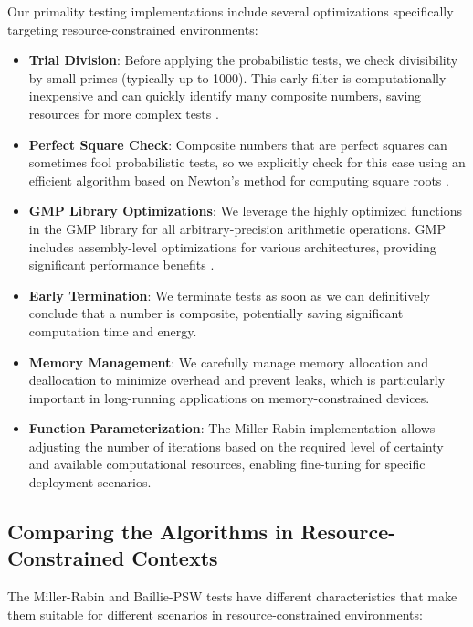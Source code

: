Our primality testing implementations include several optimizations specifically targeting resource-constrained environments:

\begin{itemize}
    \item \textbf{Trial Division}: Before applying the probabilistic tests, we check divisibility by small primes (typically up to 1000). This early filter is computationally inexpensive and can quickly identify many composite numbers, saving resources for more complex tests \cite{taxonomy_primality}.
    
    \item \textbf{Perfect Square Check}: Composite numbers that are perfect squares can sometimes fool probabilistic tests, so we explicitly check for this case using an efficient algorithm based on Newton's method for computing square roots \cite{crandall2005}.
    
    \item \textbf{GMP Library Optimizations}: We leverage the highly optimized functions in the GMP library for all arbitrary-precision arithmetic operations. GMP includes assembly-level optimizations for various architectures, providing significant performance benefits \cite{granlund2012}.
    
    \item \textbf{Early Termination}: We terminate tests as soon as we can definitively conclude that a number is composite, potentially saving significant computation time and energy.
    
    \item \textbf{Memory Management}: We carefully manage memory allocation and deallocation to minimize overhead and prevent leaks, which is particularly important in long-running applications on memory-constrained devices.
    
    \item \textbf{Function Parameterization}: The Miller-Rabin implementation allows adjusting the number of iterations based on the required level of certainty and available computational resources, enabling fine-tuning for specific deployment scenarios.
\end{itemize}

\subsection{Comparing the Algorithms in Resource-Constrained Contexts}

The Miller-Rabin and Baillie-PSW tests have different characteristics that make them suitable for different scenarios in resource-constrained environments:

